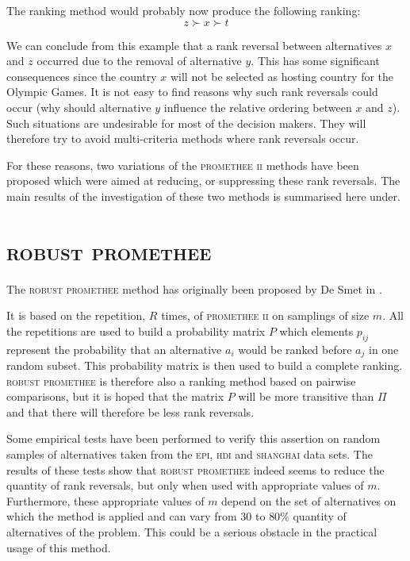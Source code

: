 \documentclass[conference,compsoc]{IEEEtran}
\begin{document}
The ranking method would probably now produce the following ranking:
\begin{equation}
  z \succ x \succ t
  \label{eq:ranking_3alt_t}
\end{equation}

We can conclude from this example that a rank reversal between alternatives $x$ and $z$ occurred due to the removal of alternative $y$. This has some significant consequences since the country $x$ will not be selected as hosting country for the Olympic Games. It is not easy to find reasons why such rank reversals could occur (why should alternative $y$ influence the relative ordering between $x$ and $z$). Such situations are undesirable for most of the decision makers. They will therefore try to avoid multi-criteria methods where rank reversals occur.

For these reasons, two variations of the \textsc{promethee ii} methods have been proposed which were aimed at reducing, or suppressing these rank reversals. The main results of the investigation of these two methods is summarised here under.

\section{\textsc{robust promethee}}


The \textsc{robust promethee} method has originally been proposed by De Smet in \cite{RobPII}. 

It is based on the repetition, $R$ times, of \textsc{promethee ii} on samplings of size $m$. All the repetitions are used to build a probability matrix $P$ which elements $p_{ij}$ represent the probability that an alternative $a_i$ would be ranked before $a_j$ in one random subset. This probability matrix is then used to build a complete ranking. \textsc{robust promethee} is therefore also a ranking method based on pairwise comparisons, but it is hoped that the matrix $P$ will be more transitive than $\Pi$ and that there will therefore be less rank reversals.

Some empirical tests have been performed to verify this assertion on random samples of alternatives taken from the \textsc{epi}\cite{EPI}, \textsc{hdi}\cite{HDI} and \textsc{shanghai}\cite{SHA} data sets.
The results of these tests show that \textsc{robust promethee} indeed seems to reduce the quantity of rank reversals, but only when used with appropriate values of $m$. Furthermore, these appropriate values of $m$ depend on the set of alternatives on which the method is applied and can vary from $30$ to $80 \%$ quantity of alternatives of the problem. This could be a serious obstacle in the practical usage of this method.
\end{document}
